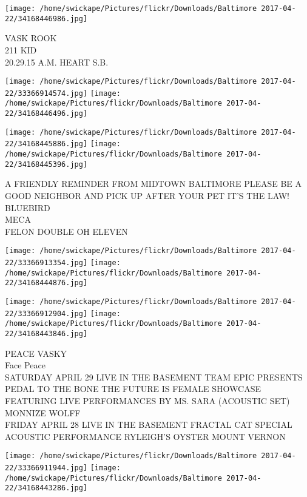 \documentclass[10pt,letterpaper]{article}
\begin{document}
\vspace{0.25in}
\texttt{[image: /home/swickape/Pictures/flickr/Downloads/Baltimore 2017-04-22/34168446986.jpg]}

VASK ROOK\\
211 KID\\
20.29.15 A.M. HEART S.B.\\
\pagebreak

\texttt{[image: /home/swickape/Pictures/flickr/Downloads/Baltimore 2017-04-22/33366914574.jpg]}
\texttt{[image: /home/swickape/Pictures/flickr/Downloads/Baltimore 2017-04-22/34168446496.jpg]}

\texttt{[image: /home/swickape/Pictures/flickr/Downloads/Baltimore 2017-04-22/34168445886.jpg]}
\texttt{[image: /home/swickape/Pictures/flickr/Downloads/Baltimore 2017-04-22/34168445396.jpg]}

A FRIENDLY REMINDER FROM MIDTOWN BALTIMORE PLEASE BE A GOOD NEIGHBOR AND PICK UP AFTER YOUR PET IT'S THE LAW!\\
BLUEBIRD\\
MECA\\
FELON DOUBLE OH ELEVEN\\
\pagebreak

\texttt{[image: /home/swickape/Pictures/flickr/Downloads/Baltimore 2017-04-22/33366913354.jpg]}
\texttt{[image: /home/swickape/Pictures/flickr/Downloads/Baltimore 2017-04-22/34168444876.jpg]}

\texttt{[image: /home/swickape/Pictures/flickr/Downloads/Baltimore 2017-04-22/33366912904.jpg]}
\texttt{[image: /home/swickape/Pictures/flickr/Downloads/Baltimore 2017-04-22/34168443846.jpg]}

PEACE VASKY\\
Face Peace\\
SATURDAY APRIL 29 LIVE IN THE BASEMENT TEAM EPIC PRESENTS PEDAL TO THE BONE THE FUTURE IS FEMALE SHOWCASE FEATURING LIVE PERFORMANCES BY MS. SARA (ACOUSTIC SET)  MONNIZE WOLFF\\
FRIDAY APRIL 28 LIVE IN THE BASEMENT FRACTAL CAT SPECIAL ACOUSTIC PERFORMANCE RYLEIGH'S OYSTER MOUNT VERNON\\
\pagebreak

\texttt{[image: /home/swickape/Pictures/flickr/Downloads/Baltimore 2017-04-22/33366911944.jpg]}
\texttt{[image: /home/swickape/Pictures/flickr/Downloads/Baltimore 2017-04-22/34168443286.jpg]}
\end{document}
